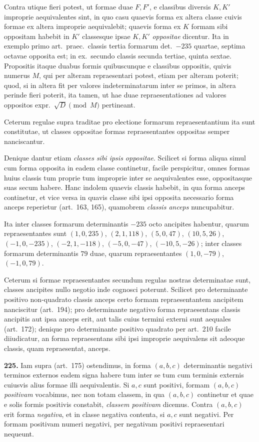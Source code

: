 \documentclass[12pt,a4paper]{article}
\theoremstyle{plain}
\theoremstyle{definition}
\theoremstyle{remark}
\begin{document}
Contra utique fieri potest, ut formae duae $F,F'$, e classibus diversis $K,K'$ improprie aequivalentes sint, in quo casu quaevis forma ex altera classe cuivis formae ex altera improprie aequivalebit; quaevis forma ex $K$ formam sibi oppositam habebit in $K'$ classesque ipsae $K,K'$ \emph{oppositae} dicentur. Ita in exemplo primo art.\ praec.\ classis tertia formarum det.\ $-235$ quartae, septima octavae opposita est; in ex.\ secundo classis secunda tertiae, quinta sextae. Propositis itaque duabus formis quibuscunque e classibus oppositis, quivis numerus $M$, qui per alteram repraesentari potest, etiam per alteram poterit; quod, si in altera fit per valores indeterminatarum inter se primos, in altera perinde fieri poterit, ita tamen, ut hae duae repraesentationes ad valores oppositos expr.\ $\sqrt{D}\pmod{M}$ pertineant.

Ceterum regulae supra traditae pro electione formarum repraesentantium ita sunt constitutae, ut classes oppositae formas repraesentantes oppositas semper nanciscantur.

Denique dantur etiam \emph{classes sibi ipsis oppositae}. Scilicet si forma aliqua simul cum forma opposita in eadem classe continetur, facile perspicitur, omnes formas huius classis tum proprie tum improprie inter se aequivalentes esse, oppositasque suas secum habere. Hanc indolem quaevis classis habebit, in qua forma anceps continetur, et vice versa in quavis classe sibi ipsi opposita necessario forma anceps reperietur (art.~163, 165), quamobrem \emph{classis anceps} nuncupabitur.

Ita inter classes formarum determinantis $-235$ octo ancipites habentur, quarum repraesentantes sunt $(1,0,235)$, $(2,1,118)$, $(5,0,47)$, $(10,5,26)$, $(-1,0,-235)$, $(-2,1,-118)$, $(-5,0,-47)$, $(-10,5,-26)$; inter classes formarum determinantis $79$ duae, quarum repraesentantes $(1,0,-79)$, $(-1,0,79)$.

Ceterum si formae repraesentantes secundum regulas nostras determinatae sunt, classes ancipites nullo negotio inde cognosci poterunt. Scilicet pro determinante positivo non-quadrato classis anceps certo formam repraesentantem ancipitem nanciscitur (art.~194); pro determinante negativo forma repraesentans classis ancipitis aut ipsa anceps erit, aut talis cuius termini externi sunt aequales (art.~172); denique pro determinante positivo quadrato per art.~210 facile diiudicatur, an forma repraesentans sibi ipsi improprie aequivalens sit adeoque classis, quam repraesentat, anceps.

\textbf{225.}
Iam supra (art.~175) ostendimus, in forma $(a,b,c)$ determinantis negativi terminos externos eadem signa habere tum inter se tum cum terminis externis cuiusvis alius formae illi aequivalentis. Si $a,c$ sunt positivi, formam $(a,b,c)$ \emph{positivam} vocabimus, nec non totam classem, in qua $(a,b,c)$ continetur et quae e solis formis positivis constabit, \emph{classem positivam} dicemus. Contra $(a,b,c)$ erit forma \emph{negativa}, et in classe negativa contenta, si $a,c$ sunt negativi. Per formam positivam numeri negativi, per negativam positivi repraesentari nequeunt.
\end{document}
